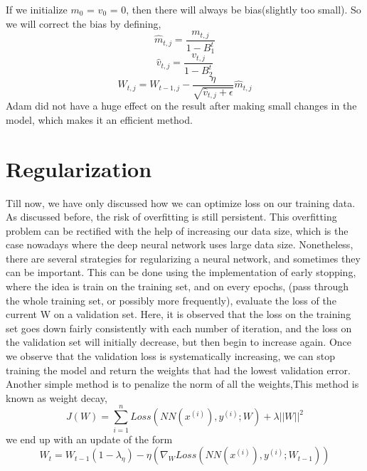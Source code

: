 If we initialize $m_0$ = $v_0$ = 0, then there will always be bias(slightly too small). So we will correct the bias by defining,
\begin{equation*}
    \hat{m}_{t,j} = \frac{m_{t,j}}{1-B_1^t}
\end{equation*}
\begin{equation*}
    \hat{v}_{t,j} = \frac{v_{t,j}}{1-B_2^t}
\end{equation*}
\begin{equation*}
    W_{t,j} = W_{t-1, j} - \frac{\eta}{\sqrt{ \hat{v}_{t,j}+\epsilon}}\hat{m}_{t,j} 
\end{equation*}
Adam did not have a huge effect on the result after making small changes in the model, which makes it an efficient method.

\section{Regularization}

Till now, we have only discussed how we can optimize loss on our training data. As discussed before, the risk of overfitting is still persistent. This overfitting problem can be rectified with the help of increasing our data size, which is the case nowadays where the deep neural network uses large data size. Nonetheless, there are several strategies for regularizing a neural network, and sometimes they can be important. This can be done using the implementation of early stopping, where the idea is train on the training set, and on every epochs, (pass through the whole training set, or possibly more frequently), evaluate the loss of the current W on a validation set. Here, it is observed that the loss on the training set goes down fairly consistently with each number of iteration, and the loss on the validation set will initially decrease, but then begin to increase
again. Once we observe that the validation loss is systematically increasing, we can stop training the model and return the weights that had the lowest validation error.\\

Another simple method is to penalize the norm of all the weights,This method is known as weight decay,
\begin{equation*}
    J(W) = \sum_{i=1}^n Loss(NN(x^{(i)}), y^{(i)};W) + \lambda ||W||^2
\end{equation*}
we end up with an update of the form\\
\begin{equation*}
    W_t = W_{t-1}(1-\lambda_\eta) - \eta (\nabla_W Loss(NN(x^{(i)}), y^{(i)};W_{t-1}))
\end{equation*}


